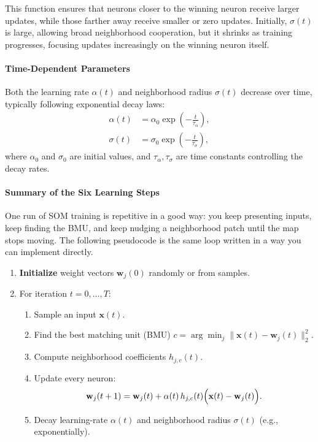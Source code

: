 This function ensures that neurons closer to the winning neuron receive larger updates, while those farther away receive smaller or zero updates. Initially, \(\sigma(t)\) is large, allowing broad neighborhood cooperation, but it shrinks as training progresses, focusing updates increasingly on the winning neuron itself.

\paragraph{Time-Dependent Parameters}

Both the learning rate \(\alpha(t)\) and neighborhood radius \(\sigma(t)\) decrease over time, typically following exponential decay laws:
\begin{equation}
\begin{aligned}
    \alpha(t) &= \alpha_0 \exp\left(-\frac{t}{\tau_\alpha}\right), \\
    \sigma(t) &= \sigma_0 \exp\left(-\frac{t}{\tau_\sigma}\right),
\end{aligned}
\label{eq:decay_parameters}
\end{equation}
where \(\alpha_0\) and \(\sigma_0\) are initial values, and \(\tau_\alpha, \tau_\sigma\) are time constants controlling the decay rates.

\paragraph{Summary of the Six Learning Steps}
\label{sec:som_training_steps}

One run of SOM training is repetitive in a good way: you keep presenting inputs, keep finding the BMU, and keep nudging a neighborhood patch until the map stops moving. The following pseudocode is the same loop written in a way you can implement directly.

\begin{tcolorbox}[summarybox, title={Self-Organizing Map (SOM) training pseudocode}]
\begin{enumerate}
    \item \textbf{Initialize} weight vectors \(\mathbf{w}_j(0)\) randomly or from samples.
    \item For iteration \(t=0,\ldots, T\):
    \begin{enumerate}
        \item Sample an input \(\mathbf{x}(t)\).
        \item Find the best matching unit (BMU) \(c = \arg\min_{j} \|\mathbf{x}(t)-\mathbf{w}_j(t)\|_2^2\).
        \item Compute neighborhood coefficients \(h_{j, c}(t)\).
        \item Update every neuron:
        \[
            \mathbf{w}_j(t+1) = \mathbf{w}_j(t) + \alpha(t)\, h_{j, c}(t)\Bigl(\mathbf{x}(t)-\mathbf{w}_j(t)\Bigr).
        \]
        \item Decay learning-rate \(\alpha(t)\) and neighborhood radius \(\sigma(t)\) (e.g., exponentially).
    \end{enumerate}
\end{enumerate}
\end{tcolorbox}

